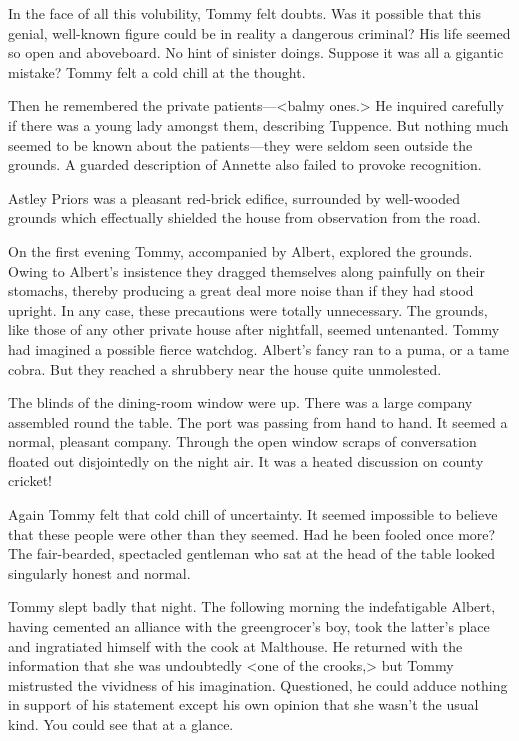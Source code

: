 In the face of all this volubility, Tommy felt doubts. Was it possible that this genial, well-known figure could be in reality a dangerous criminal? His life seemed so open and aboveboard. No hint of sinister doings. Suppose it was all a gigantic mistake? Tommy felt a cold chill at the thought.

Then he remembered the private patients—<balmy ones.> He inquired carefully if there was a young lady amongst them, describing Tuppence. But nothing much seemed to be known about the patients—they were seldom seen outside the grounds. A guarded description of Annette also failed to provoke recognition.

Astley Priors was a pleasant red-brick edifice, surrounded by well-wooded grounds which effectually shielded the house from observation from the road.

On the first evening Tommy, accompanied by Albert, explored the grounds. Owing to Albert's insistence they dragged themselves along painfully on their stomachs, thereby producing a great deal more noise than if they had stood upright. In any case, these precautions were totally unnecessary. The grounds, like those of any other private house after nightfall, seemed untenanted. Tommy had imagined a possible fierce watchdog. Albert's fancy ran to a puma, or a tame cobra. But they reached a shrubbery near the house quite unmolested.

The blinds of the dining-room window were up. There was a large company assembled round the table. The port was passing from hand to hand. It seemed a normal, pleasant company. Through the open window scraps of conversation floated out disjointedly on the night air. It was a heated discussion on county cricket!

Again Tommy felt that cold chill of uncertainty. It seemed impossible to believe that these people were other than they seemed. Had he been fooled once more? The fair-bearded, spectacled gentleman who sat at the head of the table looked singularly honest and normal.

Tommy slept badly that night. The following morning the indefatigable Albert, having cemented an alliance with the greengrocer's boy, took the latter's place and ingratiated himself with the cook at Malthouse. He returned with the information that she was undoubtedly <one of the crooks,> but Tommy mistrusted the vividness of his imagination. Questioned, he could adduce nothing in support of his statement except his own opinion that she wasn't the usual kind. You could see that at a glance.

